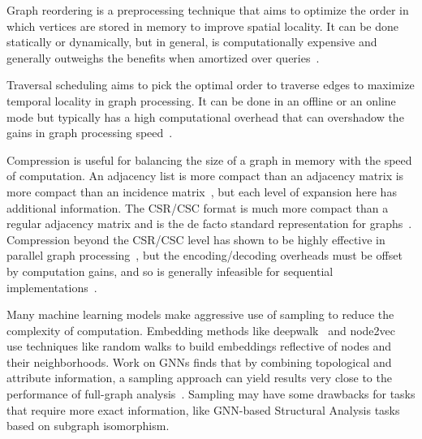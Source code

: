 Graph reordering is a preprocessing technique that aims to optimize the order in which vertices are stored in memory to improve spatial locality. 
It can be done statically or dynamically, but in general, is computationally expensive and generally outweighs the benefits when amortized over queries~\cite{Balaji2018}.

Traversal scheduling aims to pick the optimal order to traverse edges to maximize temporal locality in graph processing. 
It can be done in an offline or an online mode but typically has a high computational overhead that can overshadow the gains in graph processing speed~\cite{Mukkara2018}.

Compression is useful for balancing the size of a graph in memory with the speed of computation. 
An adjacency list is more compact than an adjacency matrix is more compact than an incidence matrix~\cite{Kepner2015}, but each level of expansion here has additional information.
The CSR/CSC format is much more compact than a regular adjacency matrix and is the de facto standard representation for graphs~\cite{Saad2003}.
Compression beyond the CSR/CSC level has shown to be highly effective in parallel graph processing~\cite{Dhulipala2021}, but the encoding/decoding overheads must be offset by computation gains, and so is generally infeasible for sequential implementations~\cite{Shun2015}.

Many machine learning models make aggressive use of sampling to reduce the complexity of computation. 
Embedding methods like deepwalk~\cite{Perozzi2014} and node2vec~\cite{Grover2016} use techniques like random walks to build embeddings reflective of nodes and their neighborhoods. 
Work on GNNs finds that by combining topological and attribute information, a sampling approach can yield results very close to the performance of full-graph analysis~\cite{Hamilton2017}.
Sampling may have some drawbacks for tasks that require more exact information, like GNN-based Structural Analysis tasks based on subgraph isomorphism.

